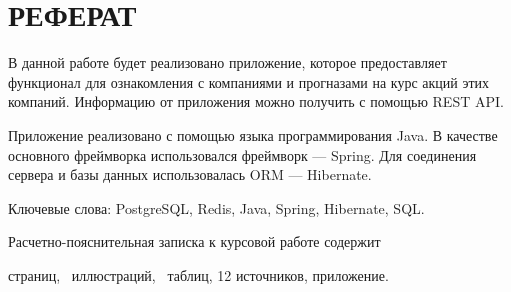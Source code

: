 
\setcounter{page}{3}

\chapter*{РЕФЕРАТ}

В данной работе будет реализовано приложение, которое предоставляет функционал для ознакомления с компаниями и прогназами на курс акций этих компаний. Информацию от приложения можно получить с помощью REST API.


Приложение реализовано с помощью языка программирования Java. В качестве основного фреймворка использовался фреймворк --- Spring. Для соединения сервера и базы данных использовалась ORM --- Hibernate.

Ключевые слова: PostgreSQL, Redis, Java, Spring, Hibernate, SQL.

Расчетно-пояснительная записка к курсовой работе содержит  \begin{NoHyper}\pageref{LastPage}\end{NoHyper} страниц, \totfig~иллюстраций, \tottab~таблиц, 12 источников,  приложение.